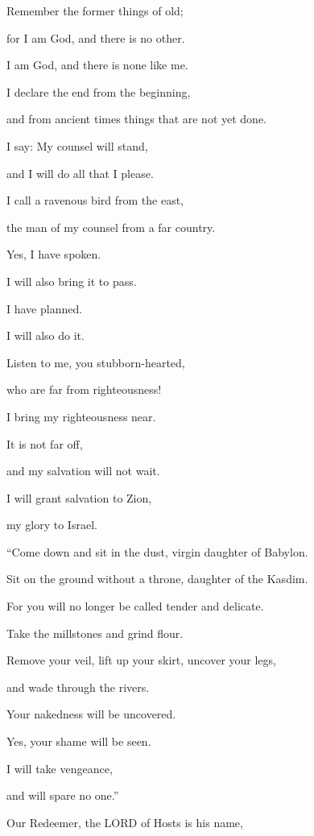\myverse{}Remember the former things of old;

for I am God, and there is no other.

I am God, and there is none like me.

\myverse{}I declare the end from the beginning,

and from ancient times things that are not yet done.

I say: My counsel will stand,

and I will do all that I please.

\myverse{}I call a ravenous bird from the east,

the man of my counsel from a far country.

Yes, I have spoken.

I will also bring it to pass.

I have planned.

I will also do it.


\vspace{\baselineskip} \myverse{}Listen to me, you stubborn-hearted,

who are far from righteousness!

\myverse{}I bring my righteousness near.

It is not far off,

and my salvation will not wait.

I will grant salvation to Zion,

my glory to Israel.


\mychapter{} \myverse*{}“Come down and sit in the dust, virgin daughter of Babylon.

\quad\quad Sit on the ground without a throne, daughter of the Kasdim.

For you will no longer be called tender and delicate.

\myverse{}Take the millstones and grind flour.

Remove your veil, lift up your skirt, uncover your legs,

and wade through the rivers.

\myverse{}Your nakedness will be uncovered.

Yes, your shame will be seen.

I will take vengeance,

and will spare no one.”


\vspace{\baselineskip} \myverse{}Our Redeemer, the LORD of Hosts is his name,

